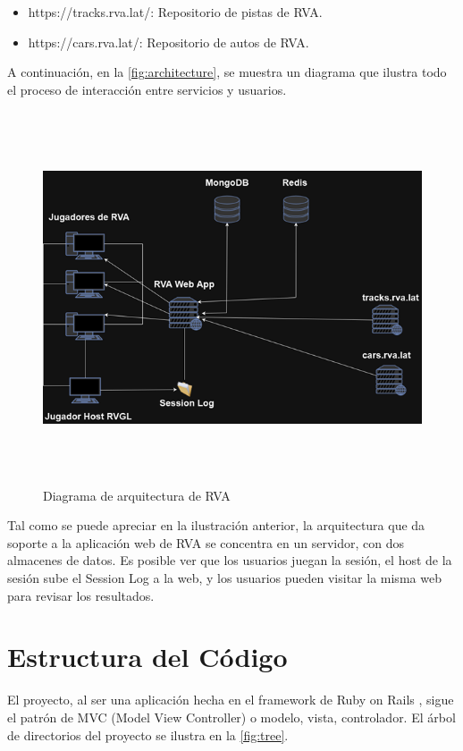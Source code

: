 \begin{itemize}
  \item https://tracks.rva.lat/: Repositorio de pistas de RVA.
  \item https://cars.rva.lat/: Repositorio de autos de RVA.
\end{itemize}

A continuación, en la \autoref{fig:architecture}, se muestra un diagrama que ilustra todo el proceso de interacción entre servicios y usuarios.

\begin{figure}[H]
  \begin{center}
    \includegraphics[width=16cm, height=11cm]{img/architecture.png} 
  \end{center}
  \caption[Diagrama de arquitectura de RVA]{Diagrama de arquitectura de RVA}
  \label{fig:architecture}
\end{figure}

Tal como se puede apreciar en la ilustración anterior, la arquitectura que da soporte a la aplicación web de RVA se concentra en un servidor, con dos almacenes de datos. Es posible ver que los usuarios juegan la sesión, el host de la sesión sube el Session Log a la web, y los usuarios pueden visitar la misma web para revisar los resultados.

\newpage

\section{Estructura del Código}
El proyecto, al ser una aplicación hecha en el framework de Ruby on Rails \cite{rubyonrails}, sigue el patrón de MVC (Model View Controller) o modelo, vista, controlador. El árbol de directorios del proyecto se ilustra en la \autoref{fig:tree}.

